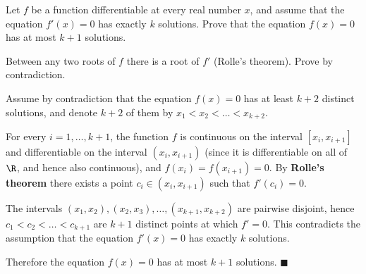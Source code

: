 
\begin{question}
Let $f$ be a function differentiable at every real number $x$, and assume that the equation $f'(x)=0$ has exactly $k$ solutions. Prove that the equation $f(x)=0$ has at most $k+1$ solutions.
\end{question}

\begin{hint}
Between any two roots of $f$ there is a root of $f'$ (Rolle's theorem). Prove by contradiction.
\end{hint}

\begin{solution}
Assume by contradiction that the equation $f(x)=0$ has at least $k+2$ distinct solutions, and denote $k+2$ of them by $x_1<x_2<\dots<x_{k+2}$.

For every $i=1,\dots,k+1$, the function $f$ is continuous on the interval $[x_i,x_{i+1}]$ and differentiable on the interval $(x_i,x_{i+1})$ (since it is differentiable on all of $\R$, and hence also continuous), and $f(x_i)=f(x_{i+1})=0$. By \textbf{Rolle's theorem} there exists a point $c_i\in(x_i,x_{i+1})$ such that $f'(c_i)=0$.

The intervals $(x_1,x_2),(x_2,x_3),\dots,(x_{k+1},x_{k+2})$ are pairwise disjoint, hence $c_1<c_2<\dots<c_{k+1}$ are $k+1$ distinct points at which $f'=0$. This contradicts the assumption that the equation $f'(x)=0$ has exactly $k$ solutions.

Therefore the equation $f(x)=0$ has at most $k+1$ solutions. $\blacksquare$
\end{solution}
